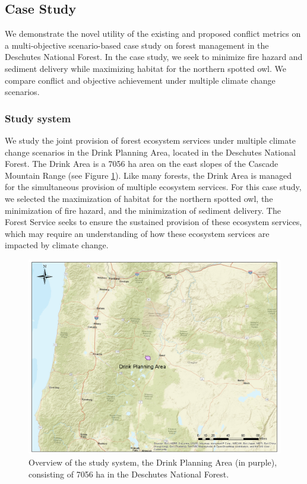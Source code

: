 \subsection{Case Study}
\label{sec:caseStudy}
We demonstrate the novel utility of the existing and proposed conflict metrics on a multi-objective scenario-based case study on forest management in the Deschutes National Forest. In the case study, we seek to minimize fire hazard and sediment delivery while maximizing habitat for the northern spotted owl. We compare conflict and objective achievement under multiple climate change scenarios.

\subsubsection{Study system}
\label{subsec:studyArea}
We study the joint provision of forest ecosystem services under multiple climate change scenarios in the Drink Planning Area, located in the Deschutes National Forest. The Drink Area is a 7056 ha area on the east slopes of the Cascade Mountain Range (see Figure \ref{fig:drinkOverview}). Like many forests, the Drink Area is managed for the simultaneous provision of multiple ecosystem services. For this case study, we selected the maximization of habitat for the northern spotted owl, the minimization of fire hazard, and the minimization of sediment delivery. The Forest Service seeks to ensure the sustained provision of these ecosystem services, which may require an understanding of how these ecosystem services are impacted by climate change.

\begin{figure}[ht]
\centering
\includegraphics[width=.85\textwidth]{../images/DrinkMap_Overview}
\caption[Overview of the study system, the Drink Planning Area]{Overview of the study system, the Drink Planning Area (in purple), consisting of 7056 ha in the Deschutes National Forest.}
\label{fig:drinkOverview}
\end{figure}

